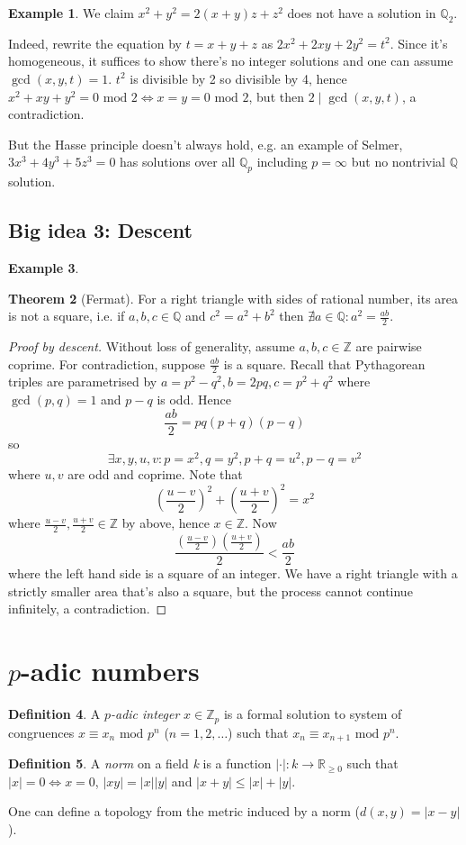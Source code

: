 \documentclass{article}
\newcommand{\Z}{\mathbb{Z}}
\newcommand{\Q}{\mathbb{Q}}
\newcommand{\R}{\mathbb{R}}
\newcommand{\Mod}{\text{ mod }}
\theoremstyle{definition}
\newtheorem{defn}{Definition}[subsection]
\newtheorem{thm}[defn]{Theorem}
\newtheorem{example}[defn]{Example}
\begin{document}
\begin{example}
We claim $x^2+y^2=2(x+y)z+z^2$ does not have a solution in $\Q_2$.

Indeed, rewrite the equation by $t=x+y+z$ as $2x^2+2xy+2y^2=t^2$. Since it's homogeneous, it suffices to show there's no integer solutions and one can assume $\gcd(x,y,t)=1$. $t^2$ is divisible by 2 so divisible by 4, hence $x^2+xy+y^2=0\Mod 2\iff x=y=0\Mod 2$, but then $2\mid\gcd(x,y,t)$, a contradiction.
\end{example}

But the Hasse principle doesn't always hold, e.g. an example of Selmer, $3x^3+4y^3+5z^3=0$ has solutions over all $\Q_p$ including $p=\infty$ but no nontrivial $\Q$ solution.

\subsection{Big idea 3: Descent}
\begin{example}
\begin{thm}[Fermat]
	For a right triangle with sides of rational number, its area is not a square, i.e. if $a,b,c\in\Q$ and $c^2=a^2+b^2$ then $\nexists a\in\Q:a^2=\frac{ab}{2}$.
\end{thm}
\begin{proof}[Proof by descent]
Without loss of generality, assume $a,b,c\in\Z$ are pairwise coprime. For contradiction, suppose $\frac{ab}{2}$ is a square. Recall that Pythagorean triples are parametrised by $a=p^2-q^2,b=2pq,c=p^2+q^2$ where $\gcd(p,q)=1$ and $p-q$ is odd. Hence
\[
\frac{ab}{2}=pq(p+q)(p-q)
\]
so
\[
\exists x,y,u,v:p=x^2,q=y^2,p+q=u^2,p-q=v^2
\]
where $u,v$ are odd and coprime. Note that
\[
\left(\frac{u-v}{2}\right)^2+\left(\frac{u+v}{2}\right)^2=x^2
\]
where $\frac{u-v}{2},\frac{u+v}{2}\in\Z$ by above, hence $x\in\Z$. Now
\[
\frac{\left(\frac{u-v}{2}\right)\left(\frac{u+v}{2}\right)}{2}<\frac{ab}{2}
\]
where the left hand side is a square of an integer. We have a right triangle with a strictly smaller area that's also a square, but the process cannot continue infinitely, a contradiction.
\end{proof}
\end{example}

\section{$p$-adic numbers}
\begin{defn}
A $p$\textit{-adic integer} $x\in\Z_p$ is a formal solution to system of congruences $x\equiv x_n\Mod p^n$ ($n=1,2,\ldots$) such that $x_n\equiv x_{n+1}\Mod p^n$.
\end{defn}
\begin{defn}
A \textit{norm} on a field \textit{k} is a function $|\cdot|:k\rightarrow \R_{\geq 0}$ such that $|x|=0\iff x=0$, $|xy|=|x||y|$ and $|x+y|\leq|x|+|y|$.
\end{defn}
One can define a topology from the metric induced by a norm ($d(x,y)=|x-y|$).
\end{document}

